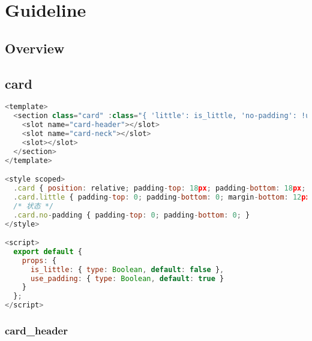\part{Guideline}


\chapter{Overview}




\chapter{card}



\begin{lstlisting}[language=JavaScript]
<template>
  <section class="card" :class="{ 'little': is_little, 'no-padding': !use_padding }">
    <slot name="card-header"></slot>
    <slot name="card-neck"></slot>
    <slot></slot>
  </section>
</template>

<style scoped>
  .card { position: relative; padding-top: 18px; padding-bottom: 18px; }
  .card.little { padding-top: 0; padding-bottom: 0; margin-bottom: 12px; }
  /* 状态 */
  .card.no-padding { padding-top: 0; padding-bottom: 0; }
</style>

<script>
  export default {
    props: {
      is_little: { type: Boolean, default: false },
      use_padding: { type: Boolean, default: true }
    }
  };
</script>
\end{lstlisting}

\section{card\_header}



